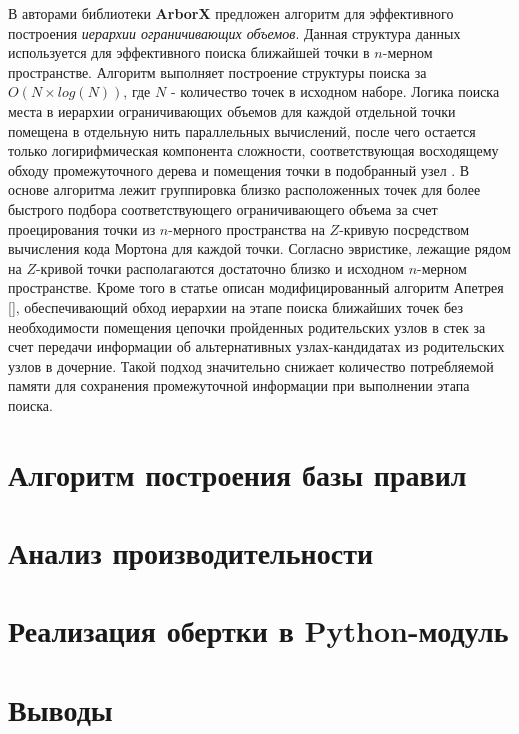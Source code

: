 В \cite{prokopenko2024revisingapetreisboundingvolume} авторами библиотеки \textbf{ArborX} предложен алгоритм для эффективного построения \textit{иерархии ограничивающих объемов}. Данная структура данных используется для эффективного поиска ближайшей точки в $n$-мерном пространстве. Алгоритм выполняет построение структуры поиска за $O(N\times log(N))$, где $N$ - количество точек в исходном наборе. Логика поиска места в иерархии ограничивающих объемов для каждой отдельной точки помещена в отдельную нить параллельных вычислений, после чего остается только логирифмическая компонента сложности, соответствующая восходящему обходу промежуточного дерева и помещения точки в подобранный узел . В основе алгоритма лежит группировка близко расположенных точек для более быстрого подбора соответствующего ограничивающего объема за счет проецирования точки из $n$-мерного пространства на $Z$-кривую посредством вычисления кода Мортона для каждой точки. Согласно эвристике, лежащие рядом на $Z$-кривой точки располагаются достаточно близко и исходном $n$-мерном пространстве. Кроме того в статье описан модифицированный алгоритм Апетрея [], обеспечивающий обход иерархии на этапе поиска ближайших точек без необходимости помещения цепочки пройденных родительских узлов в стек за счет передачи информации об альтернативных узлах-кандидатах из родительских узлов в дочерние. Такой подход значительно снижает количество потребляемой памяти для сохранения промежуточной информации при выполнении этапа поиска.

\section{Алгоритм построения базы правил}

\section{Анализ производительности}


\section{Реализация обертки в Python-модуль}

\section{Выводы}

